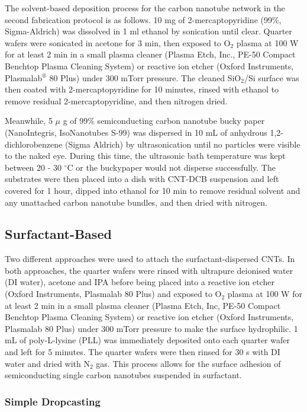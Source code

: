 \documentclass[
  a4paper,
]{scrbook}
\begin{document}
The solvent-based deposition process for the carbon nanotube network in
the second fabrication protocol is as follows. 10 mg of
2-mercaptopyridine (99\%, Sigma-Aldrich) was dissolved in 1 ml ethanol
by sonication until clear. Quarter wafers were sonicated in acetone for
3 min, then exposed to O\(_2\) plasma at 100 W for at least 2 min in a
small plasma cleaner (Plasma Etch, Inc., PE-50 Compact Benchtop Plasma
Cleaning System) or reactive ion etcher (Oxford Instruments,
Plasmalab\(^\circledR\) 80 Plus) under 300 mTorr pressure. The cleaned
SiO\(_2\)/Si surface was then coated with 2-mercaptopyridine for 10
minutes, rinsed with ethanol to remove residual \(2\)-mercaptopyridine,
and then nitrogen dried.

Meanwhile, 5 \(\mu\) g of 99\% semiconducting carbon nanotube bucky
paper (NanoIntegris, IsoNanotubes S-99) was dispersed in 10 mL of
anhydrous 1,2-dichlorobenzene (Sigma Aldrich) by ultrasonication until
no particles were visible to the naked eye. During this time, the
ultrasonic bath temperature was kept between 20 - 30 \(^\circ\)C or the
buckypaper would not disperse successfully. The substrates were then
placed into a dish with CNT-DCB suspension and left covered for 1 hour,
dipped into ethanol for 10 min to remove residual solvent and any
unattached carbon nanotube bundles, and then dried with nitrogen.

\hypertarget{surfactant-based}{%
\subsection{Surfactant-Based}\label{surfactant-based}}

Two different approaches were used to attach the surfactant-dispersed
CNTs. In both approaches, the quarter wafers were rinsed with ultrapure
deionised water (DI water), acetone and IPA before being placed into a
reactive ion etcher (Oxford Instruments, Plasmalab 80 Plus) and exposed
to O\(_2\) plasma at 100 W for at least 2 min in a small plasma cleaner
(Plasma Etch, Inc, PE-50 Compact Benchtop Plasma Cleaning System) or
reactive ion etcher (Oxford Instruments, Plasmalab 80 Plus) under 300
mTorr pressure to make the surface hydrophilic. 1 mL of poly-L-lysine
(PLL) was immediately deposited onto each quarter wafer and left for 5
minutes. The quarter wafers were then rinsed for 30 s with DI water and
dried with N\(_2\) gas. This process allows for the surface adhesion of
semiconducting single carbon nanotubes suspended in surfactant.

\hypertarget{simple-dropcasting}{%
\subsubsection*{Simple Dropcasting}\label{simple-dropcasting}}
\end{document}
